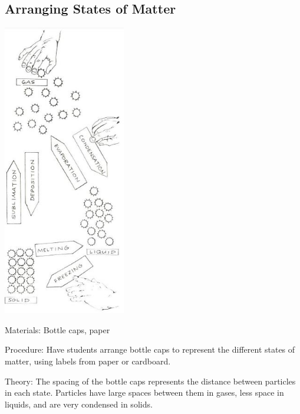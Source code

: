 \begin{multicols}{2}
\subsection{Arranging States of Matter}

\begin{center}
\includegraphics[width=0.4\textwidth]{./img/source/state-arranging.jpg}
\end{center}

\begin{description*}
\item[Materials:]{Bottle caps, paper}
\item[Procedure:]{Have students arrange bottle caps to represent the different states of matter, using labels from paper or cardboard.}
\item[Theory:]{The spacing of the bottle caps represents the distance between particles in each state. Particles have large spaces between them in gases, less space in liquids, and are very condensed in solids.}
\end{description*}


\end{multicols}
